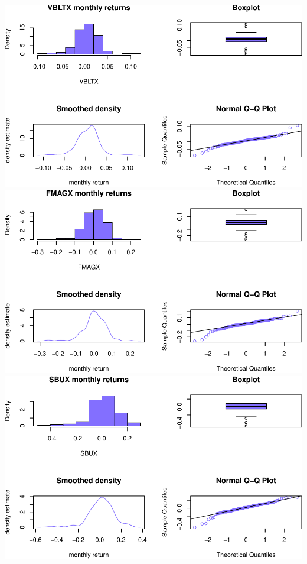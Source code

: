 \documentclass[]{article}
\begin{document}
\includegraphics{homework_4_markdown_files/figure-latex/unnamed-chunk-7-1.pdf}
\includegraphics{homework_4_markdown_files/figure-latex/unnamed-chunk-7-2.pdf}
\includegraphics{homework_4_markdown_files/figure-latex/unnamed-chunk-7-3.pdf}
\end{document}
